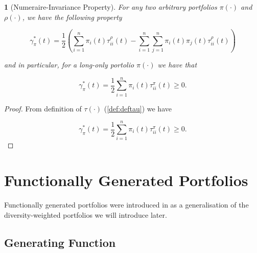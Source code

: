 \documentclass[british]{amsart} \usepackage{lmodern}
\numberwithin{equation}{section} \numberwithin{figure}{section}
\theoremstyle{plain} \newtheorem{thm}{\protect\theoremname}[section]
\theoremstyle{definition} \newtheorem{defn}[thm]{\protect\definitionname}
\theoremstyle{plain} \newtheorem{assumption}[thm]{\protect\assumptionname}
\theoremstyle{plain} \newtheorem{lem}[thm]{\protect\lemmaname}
\theoremstyle{plain} \newtheorem{prop}[thm]{\protect\propositionname}
\theoremstyle{remark} \newtheorem{rem}[thm]{\protect\remarkname}
\theoremstyle{plain} \newtheorem{cor}[thm]{\protect\corollaryname}
\begin{document}
\begin{lem} [Numeraire-Invariance Property]
 For any two arbitrary portfolios $\pi(\cdot)$ and $\rho(\cdot)$, we have the
following property 

  \begin{equation} 
    \label{eq:numeraireinvarianceproperty}
    \gamma_{\pi}^{*}(t) = \frac{1}{2} 
        \left(
          \sum_{i=1}^{n} \pi_{i}(t)\tau_{ii}^{\rho}(t) - 
          \sum_{i=1}^{n} \sum_{j=1}^{n} \pi_{i}(t)\pi_{j}(t)\tau_{ii}^{\rho}(t) 
        \right)
  \end{equation}

  and in particular, for a long-only portolio $\pi(\cdot)$ we have that

  \begin{equation} 
    \label{eq:numeraireinvarianceproperty}
    \gamma_{\pi}^{*}(t) = \frac{1}{2} 
          \sum_{i=1}^{n} \pi_{i}(t)\tau_{ii}^{\pi}(t) 
     \ge 0. 
  \end{equation}
 
\end{lem}

\begin{proof}

  From definition of $\tau(\cdot)$ (\ref{def:deftau}) we have

  \begin{equation} 
    \gamma_{\pi}^{*}(t) = \frac{1}{2} 
          \sum_{i=1}^{n} \pi_{i}(t)\tau_{ii}^{\pi}(t) 
     \ge 0. 
  \end{equation}

\end{proof}

\newpage
\section{Functionally Generated Portfolios}

Functionally generated portfolios were introduced in \cite{fernholz1999pgf} as a
generalisation of the diversity-weighted portfolios we will introduce later.

\subsection{Generating Function}

\newcommand{\G}[1]{\mathbf{G}(#1)}
\newcommand{\Gmu}{\G{\mu(t)}}
\newcommand{\g}{\mathfrak{g}(t)}
\end{document}

